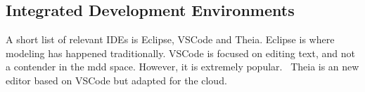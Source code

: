 \subsection{Integrated Development Environments}

A short list of relevant \glspl{IDE} is \gls{Eclipse}, \gls{VSCode} and \gls{Theia}.
\Gls{Eclipse} is where modeling has happened traditionally.
\Gls{VSCode} is focused on editing text, and not a contender in the \gls{mdd} space. However, it is extremely popular.~\cite{stackoverflowStackOverflowDeveloper2019}
\Gls{Theia} is an new editor based on \gls{VSCode} but adapted for the \gls{cloud}.

